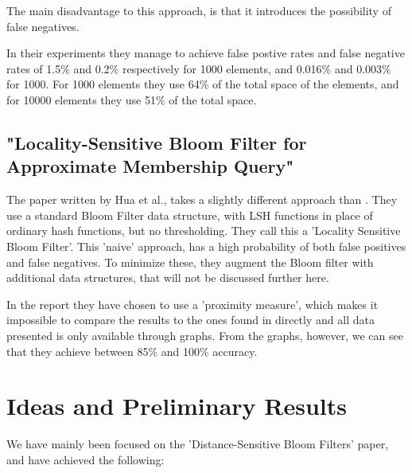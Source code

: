\documentclass[a4paper,11pt]{article}
\begin{document}
The main disadvantage to this approach, is that it introduces the possibility of false negatives. 

In their experiments they manage to achieve false postive rates and false negative rates of 1.5\% and 0.2\% respectively for 1000 elements, and 0.016\% and 0.003\% for 1000. For 1000 elements they use 64\% of the total space of the elements, and for 10000 elements they use 51\% of the total space.

\subsection{"Locality-Sensitive Bloom Filter for Approximate Membership Query"}
The paper written by Hua et al.\cite{paper:hua}, takes a slightly different approach than \cite{paper:harvard}. They use a standard Bloom Filter data structure, with LSH functions in place of ordinary hash functions, but no thresholding. They call this a 'Locality Sensitive Bloom Filter'. This 'naive' approach, has a high probability of both false positives and false negatives. To minimize these, they augment the Bloom filter with additional data structures, that will not be discussed further here.

In the report they have chosen to use a 'proximity measure', which makes it impossible to compare the results to the ones found in \cite{paper:harvard} directly and all data presented is only available through graphs. From the graphs, however, we can see that they achieve between 85\% and 100\% accuracy.

\section{Ideas and Preliminary Results}
We have mainly been focused on the 'Distance-Sensitive Bloom Filters'\cite{paper:harvard} paper, and have achieved the following:
\\
\end{document}
